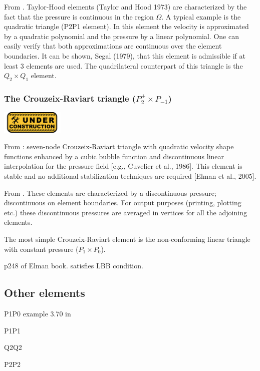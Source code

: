 From \cite{segal}.
Taylor-Hood elements (Taylor and Hood 1973) 
are characterized by the fact that the pressure is continuous in the region $\Omega$. 
A typical example is the quadratic triangle (P2P1 element).
In this element the velocity is approximated by a quadratic polynomial and the pressure by a
linear polynomial. One can easily verify that both approximations are continuous over 
the element boundaries. 
It can be shown, Segal (1979), that this element is admissible if at least 3 elements 
are used. The quadrilateral counterpart of this triangle is the $Q_2\times Q_1$ element.




\subsubsection{The Crouzeix-Raviart triangle ($P_2^+\times P_{-1}$)}
\includegraphics[width=3cm]{images/under_construction}

From \cite{daks08}: seven-node Crouzeix-Raviart triangle with quadratic velocity shape functions enhanced by a cubic bubble function and discontinuous linear interpolation for the pressure field [e.g., Cuvelier et al., 1986]. This element is stable and no additional stabilization techniques are required [Elman et al., 2005].

From \cite{segal}. These elements are characterized by a discontinuous pressure; 
discontinuous on element boundaries. 
For output purposes (printing, plotting etc.) these discontinuous pressures are averaged 
in vertices for all the adjoining elements.

The most simple Crouzeix-Raviart element is the non-conforming linear triangle 
with constant pressure ($P_1\times P_0$).

p248 of Elman book. satisfies LBB condition. 

\subsection{Other elements}

P1P0 example 3.70 in \cite{john16}

P1P1

Q2Q2

P2P2

